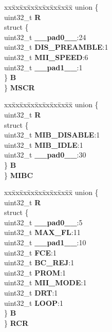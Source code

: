 \begin{DoxyCompactItemize}
\begin{tabbing}
\end{tabbing}\item 
\mbox{\label{structFEC__tag_a1372286463d42077364b879d74f73924}} 
\begin{tabbing}
xx\=xx\=xx\=xx\=xx\=xx\=xx\=xx\=xx\=\kill
union \{\\
\>uint32\_t {\bfseries R}\\
\>struct \{\\
\>\>uint32\_t {\bfseries \_\_pad0\_\_}:24\\
\>\>uint32\_t {\bfseries DIS\_PREAMBLE}:1\\
\>\>uint32\_t {\bfseries MII\_SPEED}:6\\
\>\>uint32\_t {\bfseries \_\_pad1\_\_}:1\\
\>\} {\bfseries B}\\
\} {\bfseries MSCR}\\

\end{tabbing}\item 
\mbox{\label{structFEC__tag_a302c6ca6ff6b82299f922122c10ba552}} 
\begin{tabbing}
xx\=xx\=xx\=xx\=xx\=xx\=xx\=xx\=xx\=\kill
union \{\\
\>uint32\_t {\bfseries R}\\
\>struct \{\\
\>\>uint32\_t {\bfseries MIB\_DISABLE}:1\\
\>\>uint32\_t {\bfseries MIB\_IDLE}:1\\
\>\>uint32\_t {\bfseries \_\_pad0\_\_}:30\\
\>\} {\bfseries B}\\
\} {\bfseries MIBC}\\

\end{tabbing}\item 
\mbox{\label{structFEC__tag_abbbbe0c18c08f6fdbf4658b2723e3495}} 
\begin{tabbing}
xx\=xx\=xx\=xx\=xx\=xx\=xx\=xx\=xx\=\kill
union \{\\
\>uint32\_t {\bfseries R}\\
\>struct \{\\
\>\>uint32\_t {\bfseries \_\_pad0\_\_}:5\\
\>\>uint32\_t {\bfseries MAX\_FL}:11\\
\>\>uint32\_t {\bfseries \_\_pad1\_\_}:10\\
\>\>uint32\_t {\bfseries FCE}:1\\
\>\>uint32\_t {\bfseries BC\_REJ}:1\\
\>\>uint32\_t {\bfseries PROM}:1\\
\>\>uint32\_t {\bfseries MII\_MODE}:1\\
\>\>uint32\_t {\bfseries DRT}:1\\
\>\>uint32\_t {\bfseries LOOP}:1\\
\>\} {\bfseries B}\\
\} {\bfseries RCR}\\


\end{tabbing}
\end{DoxyCompactItemize}
